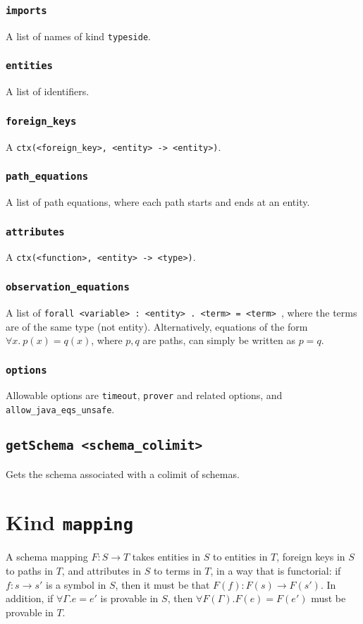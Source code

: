 \documentclass[10pt]{book}
\begin{document}
\subsection{{\tt imports}}
A list of names of kind {\tt typeside}.
\subsection{{\tt entities}}
A list of identifiers.
\subsection{{\tt foreign\_keys}}
A {\tt ctx(<foreign\_key>, <entity> -> <entity>)}.
\subsection{{\tt path\_equations}}
A list of path equations, where each path starts and ends at an entity.
\subsection{{\tt attributes}}
A {\tt ctx(<function>, <entity> -> <type>)}.
\subsection{{\tt observation\_equations}}
A list of {\tt forall <variable> : <entity> . <term> = <term> }, where the terms are of the same type (not entity).  Alternatively, equations of the form $\forall x. \ p(x) = q(x)$, where $p,q$ are paths, can simply be written as $p = q$.

\subsection{{\tt options}}
Allowable options are {\tt timeout}, {\tt prover} and related options, and {\tt allow\_java\_eqs\_unsafe}.

\section{{\tt getSchema <schema\_colimit>}}

Gets the schema associated with a colimit of schemas.

\chapter{Kind  {\tt mapping}}

A schema mapping $F : S \to T$ takes entities in $S$ to entities in $T$, foreign keys in $S$ to paths in $T$, and attributes in $S$ to terms in $T$, in a way that is functorial: if $f : s \to s'$ is a symbol in $S$, then it must be that $F(f) : F(s) \to F(s')$.  In addition, if $\forall \Gamma . e = e'$ is provable in $S$, then $\forall F(\Gamma). F(e) = F(e')$ must be provable in $T$.
\end{document}
